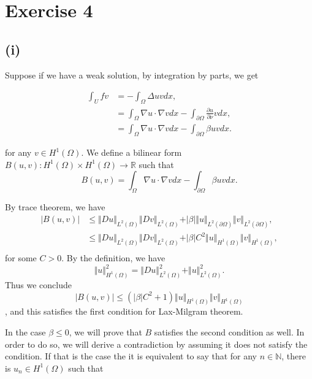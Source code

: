 \documentclass{article}
\begin{document}
\section*{Exercise 4}

\subsection*{(i)}

Suppose if we have a weak solution, by integration by parts, we get

\begin{align*}
\int_U fv &=-\int_\Omega \Delta uvdx,\\
& =  \int_{\Omega}\nabla u\cdot\nabla vdx-\int_{\partial\Omega}{\frac {\partial u} {\partial \nu}}vdx ,\\
&= \int_{\Omega}\nabla u\cdot\nabla vdx-\int_{\partial\Omega}\beta uvdx .
\end{align*}

for any $v\in H^1(\Omega)$. We define a bilinear form $B(u,v):H^1(\Omega)\times H^1(\Omega)\to\mathbb{R}$ such that
\begin{equation*}
B(u,v) =  \int_{\Omega}\nabla u\cdot\nabla vdx-\int_{\partial\Omega}\beta uvdx.
\end{equation*}

By trace theorem, we have
\begin{align*}
|B(u,v)| &\leq \Vert Du\Vert_{L^2(\Omega)}\Vert Dv\Vert_{L^2(\Omega)}+\vert\beta\vert\Vert u\Vert_{L^2(\partial\Omega)}\Vert v\Vert_{L^2(\partial\Omega)},\\
&\leq \Vert Du\Vert_{L^2(\Omega)}\Vert Dv\Vert_{L^2(\Omega)}+\vert\beta\vert C^2\Vert u\Vert_{H^1(\Omega)}\Vert v\Vert_{H^1(\Omega)},\\
\end{align*}
for some $C>0$. By the definition, we have
\begin{equation*}
\Vert u\Vert_{H^1(\Omega)}^2 = \Vert Du\Vert_{L^2(\Omega)}^2+\Vert u\Vert_{L^2(\Omega)}^2.
\end{equation*}
Thus we conclude
\begin{equation*}
|B(u,v)|\leq (\vert\beta\vert C^2+1)\Vert u\Vert_{H^1(\Omega)}\Vert v\Vert_{H^1(\Omega)}
\end{equation*}
, and this satisfies the first condition for Lax-Milgram theorem.\\

\par In the case $\beta\leq 0$, we will prove that $B$ satisfies the second condition as well. In order to do so, we will derive a contradiction by assuming it does not satisfy the condition. If that is the case the it is equivalent to say that for any $n\in\mathbb{N}$, there is $u_n\in H^1(\Omega)$ such that
\end{document}
